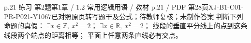 \par\noindent\begin{minipage}{\linewidth}
\begin{bankitem}{p.21 练习 第2题}{第1章 / 1.2 常用逻辑用语 / 教材 p.21 / PDF 第28页}{XJ-B1-C01-PR-P021-Y1067}{已对照原页转写题干及公式；待教师复核；未制作答案}
判断下列命题的真假：
$\exists x\in\mathbb Z,\ x^2=2$；
$\exists x\in\mathbb R,\ x^2=2$；
线段的垂直平分线上的点到这条线段两个端点的距离相等；
平面上任意两条直线必有交点。
\end{bankitem}
\end{minipage}\par\medskip
